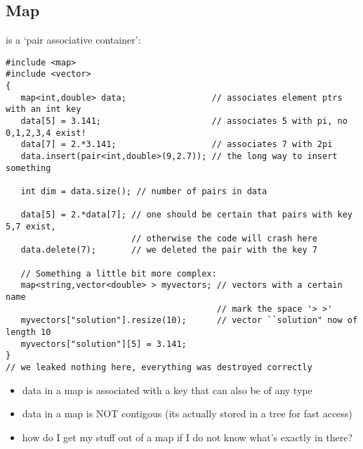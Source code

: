 \subsection{Map}
 is a `pair associative container':\\
\begin{boxedminipage}{\linewidth}
\begin{verbatim}
#include <map>
#include <vector>
{
   map<int,double> data;                 // associates element ptrs with an int key
   data[5] = 3.141;                      // associates 5 with pi, no 0,1,2,3,4 exist!
   data[7] = 2.*3.141;                   // associates 7 with 2pi
   data.insert(pair<int,double>(9,2.7)); // the long way to insert something

   int dim = data.size(); // number of pairs in data

   data[5] = 2.*data[7]; // one should be certain that pairs with key 5,7 exist,
                         // otherwise the code will crash here
   data.delete(7);       // we deleted the pair with the key 7

   // Something a little bit more complex:
   map<string,vector<double> > myvectors; // vectors with a certain name 
                                          // mark the space '> >'
   myvectors["solution"].resize(10);      // vector ``solution" now of length 10
   myvectors["solution"][5] = 3.141;
}
// we leaked nothing here, everything was destroyed correctly
\end{verbatim}
\end{boxedminipage}
\begin{itemize}
\item data in a map is associated with a key that can also be of any type
\item data in a map is NOT contigous (its actually stored in a tree for fast access)
\item how do I get my stuff out of a map if I do not know what's exactly in there?
\end{itemize}


